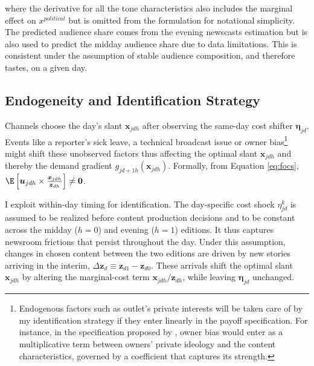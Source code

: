 \documentclass[12pt]{article}
\begin{document}
where the derivative for all the tone characteristics also includes the marginal effect on $x^{political}$ but is omitted from the formulation for notational simplicity. The predicted audience share comes from the evening newscasts estimation but is also used to predict the midday audience share due to data limitations. This is consistent under the assumption of stable audience composition, and therefore tastes, on a given day. 



\subsection{Endogeneity and Identification Strategy}


Channels choose the day’s slant \(\mathbf{x}_{jdh}\) after observing the same-day cost shifter \(\bm\eta_{jd}\). Events like a reporter's sick leave, a technical broadcast issue or owner bias\footnote{Endogenous factors  such as outlet's private interests will be taken care of by my identification strategy if they enter linearly in the payoff specification. For instance, in the specification proposed by  \cite[][]{Anderson2010MediaMA}, owner bias would enter as a multiplicative term between owners' private ideology and the content characteristics, governed by a coefficient that captures its strength.} might shift these unobserved factors  thus affecting the optimal slant \(\mathbf{x}_{jdh}\) and thereby the demand gradient \(g_{jd+1h}(\mathbf{x}_{jdh})\).  Formally, from Equation \eqref{eq:focs},  $\E\left[\bm{u}_{jdh}\times \frac{\bm{x}_{jdh}}{\bm{z}_{dh}}\right]\neq \bm{0}$.





I exploit within-day timing for identification. The day-specific cost shock $\eta_{jd}^k$ is assumed to be realized before content production decisions and to be constant across the midday ($h=0$) and evening ($h=1$) editions. It thus captures newsroom frictions that persist throughout the day. Under this assumption, changes in chosen content between the two editions are driven by new stories arriving in the interim, $\Delta \bm{z}_d \equiv \bm{z}_{d1}-\bm{z}_{d0}$. These arrivals shift the optimal slant $\mathbf{x}_{jdh}$ by altering the marginal-cost term $\bm{x}_{jdh} / \bm{z}_{dh}$, while leaving $\bm\eta_{jd}$ unchanged.
\end{document}
